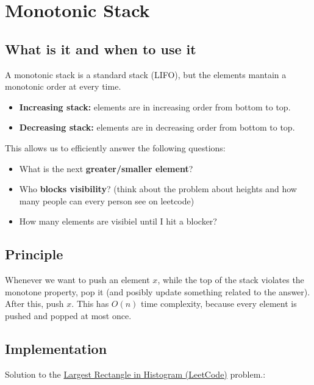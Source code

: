 \documentclass[12pt]{article}
\begin{document}
\section{Monotonic Stack}

\subsection{What is it and when to use it}

A monotonic stack is a standard stack (LIFO), but the elements mantain a monotonic order at every time.
\begin{itemize}
    \item \textbf{Increasing stack:} elements are in increasing order from bottom to top.
    \item \textbf{Decreasing stack:} elements are in decreasing order from bottom to top.
\end{itemize}

This allows us to efficiently answer the following questions:
\begin{itemize}
    \item What is the next \textbf{greater/smaller element}?
    \item Who \textbf{blocks visibility}? (think about the problem about heights and how many people can every person see on leetcode)
    \item How many elements are visibiel until I hit a blocker?
\end{itemize}

\subsection{Principle}

Whenever we want to push an element $x$, while the top of the stack violates the monotone property, pop it (and posibly update something related to the answer). After this, push $x$. This has $O(n)$ time complexity, because every element is pushed and popped at most once.

\subsection{Implementation}
Solution to the \href{https://leetcode.com/problems/largest-rectangle-in-histogram/}{Largest Rectangle in Histogram (LeetCode)} problem.:
\end{document}
